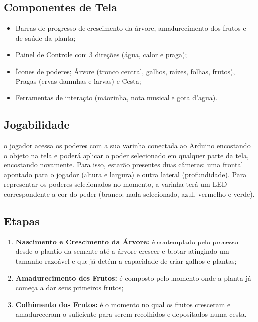 \documentclass[12pt]{article}
\begin{document}
\subsection{Componentes de Tela}
\begin{itemize}
\item Barras de progresso de crescimento da \'arvore, amadurecimento dos frutos e de sa\'ude da planta;
\item Painel de Controle com 3 dire\c c\~oes (\'agua, calor e praga);
\item \'Icones de poderes; \'Arvore (tronco central, galhos, ra\'izes, folhas, frutos), Pragas (ervas daninhas e larvas) e Cesta;
\item Ferramentas de intera\c c\~ao (m\~aozinha, nota musical e gota d'agua).
\end{itemize}

\subsection{Jogabilidade}
o jogador acessa os poderes com a sua varinha conectada ao Arduino encostando
o objeto na tela e poder\'a aplicar o poder selecionado em qualquer parte da tela,
encostando novamente. Para isso, estar\~ao presentes duas c\^ameras: uma frontal
apontado para o jogador (altura e largura) e outra lateral (profundidade).
Para representar os poderes selecionados no momento, a varinha ter\'a um LED
correspondente a cor do poder (branco: nada selecionado, azul, vermelho e verde).

\subsection{Etapas}
\begin{enumerate}
\item \textbf{Nascimento e Crescimento da \'Arvore:} \'e contemplado pelo processo desde o plantio
 da semente at\'e a \'arvore crescer e brotar atingindo um tamanho razo\'avel e que j\'a det\'em a
 capacidade de criar galhos e plantas;
\item \textbf{Amadurecimento dos Frutos:} \'e composto pelo momento onde a planta j\'a
 come\c ca a dar seus primeiros frutos;
\item \textbf{Colhimento dos Frutos:} \'e o momento no qual os frutos cresceram e amadureceram
 o suficiente para serem recolhidos e depositados numa cesta.
\end{enumerate}
\end{document}
